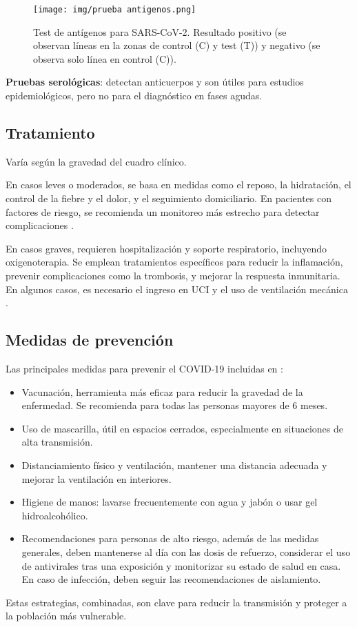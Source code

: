 \begin{figure}[H]
        \centering
        \texttt{[image: img/prueba antigenos.png]}
        \caption{Test de antígenos para SARS-CoV-2. Resultado positivo (se observan líneas en la zonas de control (C) y test (T)) y negativo (se observa solo línea en control (C)).}
        \label{fig:antigenos}
        \vspace{0.5cm} %
\end{figure}

\textbf{Pruebas serológicas}: detectan anticuerpos y son útiles para estudios epidemiológicos, pero no para el diagnóstico en fases agudas.

\subsection{Tratamiento}
Varía según la gravedad del cuadro clínico.

En casos leves o moderados, se basa en medidas como el reposo, la hidratación, el control de la fiebre y el dolor, y el seguimiento domiciliario. En pacientes con factores de riesgo, se recomienda un monitoreo más estrecho para detectar complicaciones \cite{qaseem2023outpatient}.

En casos graves, requieren hospitalización y soporte respiratorio, incluyendo oxigenoterapia. Se emplean tratamientos específicos para reducir la inflamación, prevenir complicaciones como la trombosis, y mejorar la respuesta inmunitaria. En algunos casos, es necesario el ingreso en UCI y el uso de ventilación mecánica \cite{wiersinga2020pathophysiology}.

\subsection{Medidas de prevención}
Las principales medidas para prevenir el COVID-19 incluidas en \cite{hutchins2020covid}:
\begin{itemize}
    \item Vacunación, herramienta más eficaz para reducir la gravedad de la enfermedad. Se recomienda para todas las personas mayores de 6 meses.
    \item Uso de mascarilla, útil en espacios cerrados, especialmente en situaciones de alta transmisión.
    \item Distanciamiento físico y ventilación, mantener una distancia adecuada y mejorar la ventilación en interiores.
    \item Higiene de manos: lavarse frecuentemente con agua y jabón o usar gel hidroalcohólico.
    \item Recomendaciones para personas de alto riesgo, además de las medidas generales, deben mantenerse al día con las dosis de refuerzo, considerar el uso de antivirales tras una exposición y monitorizar su estado de salud en casa. En caso de infección, deben seguir las recomendaciones de aislamiento.
\end{itemize} 
Estas estrategias, combinadas, son clave para reducir la transmisión y proteger a la población más vulnerable.

